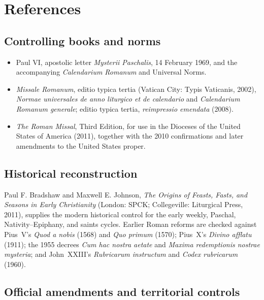 \section{References}

\subsection{Controlling books and norms}

\begin{itemize}
\item Paul VI, apostolic letter \emph{Mysterii Paschalis}, 14 February 1969, and the accompanying \emph{Calendarium Romanum} and Universal Norms.
\item \emph{Missale Romanum}, editio typica tertia (Vatican City: Typis Vaticanis, 2002), \emph{Normae universales de anno liturgico et de calendario} and \emph{Calendarium Romanum generale}; editio typica tertia, \emph{reimpressio emendata} (2008).
\item \emph{The Roman Missal}, Third Edition, for use in the Dioceses of the United States of America (2011), together with the 2010 confirmations and later amendments to the United States proper.
\end{itemize}

\subsection{Historical reconstruction}

Paul F. Bradshaw and Maxwell E. Johnson, \emph{The Origins of Feasts, Fasts, and Seasons in Early Christianity} (London: SPCK; Collegeville: Liturgical Press, 2011), supplies the modern historical control for the early weekly, Paschal, Nativity--Epiphany, and saints cycles. Earlier Roman reforms are checked against Pius~V's \emph{Quod a nobis} (1568) and \emph{Quo primum} (1570); Pius~X's \emph{Divino afflatu} (1911); the 1955 decrees \emph{Cum hac nostra aetate} and \emph{Maxima redemptionis nostrae mysteria}; and John~XXIII's \emph{Rubricarum instructum} and \emph{Codex rubricarum} (1960).

\subsection{Official amendments and territorial controls}


